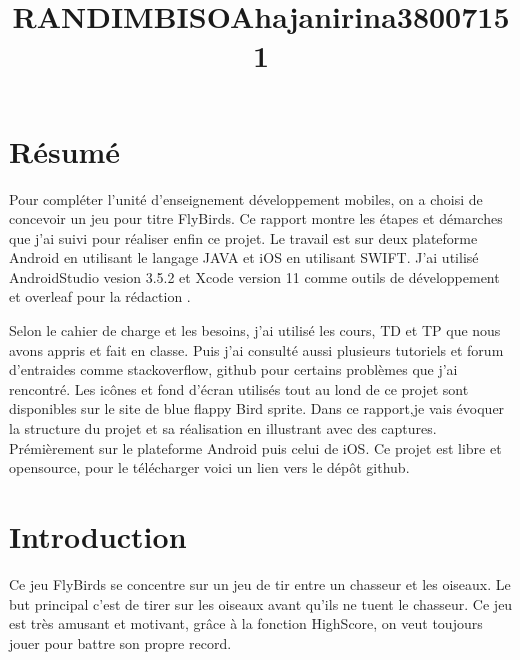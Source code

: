 \documentclass{rapportECL}
\title{RANDIMBISOAhajanirina38007151} %
\begin{document}

\sujet{-} %



        
\fairemarges %
\fairepagedegarde %
\listoffigures  %
\tabledematieres %





\section{Résumé} 

Pour compléter l'unité d'enseignement développement mobiles, on a choisi de concevoir un jeu pour titre FlyBirds. Ce rapport montre les étapes et démarches que j'ai suivi pour réaliser enfin ce projet. Le travail est sur deux plateforme Android en utilisant le langage JAVA et iOS en utilisant SWIFT. J'ai utilisé AndroidStudio\cite{AndroidStudio} vesion 3.5.2 et Xcode\cite{iOS} version 11 comme outils de développement et overleaf pour la rédaction \cite{Overleaf}.

Selon le cahier de charge et les besoins\cite{Cours}, j'ai utilisé les cours, TD et TP que nous avons appris et fait en classe. Puis j'ai consulté aussi plusieurs tutoriels\cite{OpenClassroom} et forum d'entraides comme stackoverflow\cite{Stackoverflow}, github\cite{Github} pour certains problèmes que j'ai rencontré. Les icônes et fond d'écran utilisés tout au lond de ce projet sont disponibles sur le site de blue flappy Bird sprite\cite{Icon}.
Dans ce rapport,je vais évoquer la structure du projet et sa  réalisation en illustrant avec des captures. Prémièrement sur le plateforme Android puis celui de iOS. Ce projet est libre et opensource, pour le télécharger voici un lien vers le dépôt github\cite{Githubd}.



\section{Introduction}
Ce jeu FlyBirds se concentre sur un jeu de tir entre un chasseur et les oiseaux. Le but principal c'est de tirer sur les oiseaux avant qu'ils ne tuent le chasseur. Ce jeu est très amusant et motivant, grâce à la fonction HighScore, on veut toujours jouer pour battre son propre record.
\end{document}
